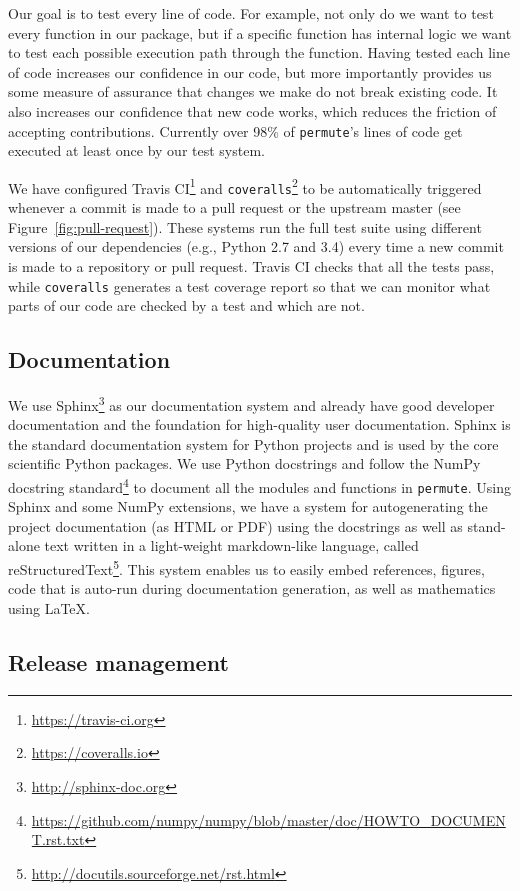 \documentclass[]{article}
\begin{document}
Our goal is to test every line of code.
For example, not only do we want to test every function in our package, but if
a specific function has internal logic we want to test each possible execution
path through the function.
Having tested each line of code increases our confidence in our code, but
more importantly provides us some measure of assurance that changes we make do
not break existing code.
It also increases our confidence that new code works, which reduces the
friction of accepting contributions.
Currently over 98\% of \texttt{permute}'s lines of code get executed at least
once by our test system.

We have configured Travis CI\footnote{
  \url{https://travis-ci.org}
} 
and
\texttt{coveralls}\footnote{
  \url{https://coveralls.io}
}
to be automatically
triggered whenever a commit is made to a pull request or the upstream master
(see Figure~\ref{fig:pull-request}).
These systems run the full test suite using different versions of our
dependencies (e.g., Python 2.7 and 3.4) every time a new commit is made to a
repository or pull request.
Travis CI checks that all the tests pass, while \texttt{coveralls} generates a
test coverage report so that we can monitor what parts of our code are checked
by a test and which are not.

\subsection{Documentation}

We use Sphinx\footnote{
   \url{http://sphinx-doc.org}
} 
as our documentation system
and already have good developer documentation and the foundation for
high-quality user documentation.
Sphinx is the standard documentation system for Python projects and is used by
the core scientific Python packages.
We use Python docstrings and follow the NumPy docstring
standard\footnote{
   \url{https://github.com/numpy/numpy/blob/master/doc/HOWTO\_DOCUMENT.rst.txt}
}
to document all the modules and functions in \texttt{permute}.
Using Sphinx and some NumPy extensions, we have a system for autogenerating the
project documentation (as HTML or PDF) using the docstrings as well as
stand-alone text written in a light-weight markdown-like language, called
reStructuredText\footnote{\url{http://docutils.sourceforge.net/rst.html}}.
This system enables us to easily embed references, figures, code that is
auto-run during documentation generation, as well as mathematics using \LaTeX.

\subsection{Release management}
\end{document}
